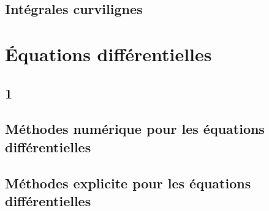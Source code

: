 \chapter{Intégrales curvilignes}
\part{Équations différentielles}
\chapter{1}
\chapter{Méthodes numérique pour les équations différentielles}
\chapter{Méthodes explicite pour les équations différentielles}
